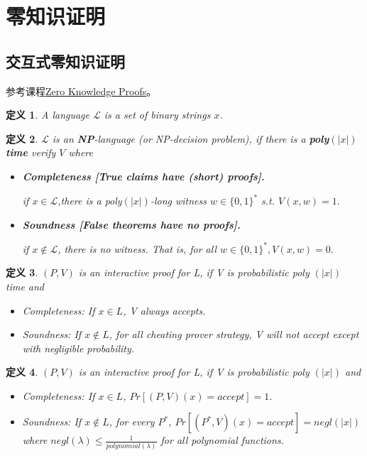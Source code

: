 \documentclass[10pt]{ctexart}
\newtheorem{definition}{定义}
\begin{document}
\section{零知识证明}
\subsection{交互式零知识证明}
参考课程\href{https://zk-learning.org/}{Zero Knowledge Proofs}。
\begin{definition}
	A language $\mathcal{L}$ is a set of binary strings $x$.
\end{definition}
\begin{definition}
	$\mathcal{L}$ is an \textbf{NP}-language (or NP-decision problem), if there is a \textbf{poly$(|x|)$ time} verify $V$ where
	\begin{itemize}
		 \item \textbf{Completeness [True claims have (short) proofs].}
		 
		if $x \in \mathcal{L}$,there is a poly$(|x|)$-long witness $w \in \{0,1\}^*$ s.t. $V(x,w) = 1.$
		\item \textbf{Soundness [False theorems have no proofs].}
		
		if $x \notin \mathcal{L}$, there is no witness. That is, for all $w \in \{0,1\}^*,V(x,w) = 0.$
	\end{itemize}
\end{definition}

\begin{definition}
	$(P, V)$ is an interactive proof for L, if V is probabilistic poly $(|x|)$ time and
	\begin{itemize}
		\item Completeness: If $x \in L$, V always accepts.
		\item Soundness: If $x \notin L$, for all {\color{blue}cheating prover strategy}, V will not accept
		except with negligible probability.
	\end{itemize}
\end{definition}

\begin{definition}
	$(P, V)$ is an interactive proof for L, if V is probabilistic poly $(|x|)$ and
	\begin{itemize}
		\item Completeness: If $x\in L$, $Pr[(P,V)(x)= accept]=1$.
		\item Soundness: If $x \notin L$, for every $P^*$, $Pr[(P^*,V)(x)= accept]=negl(|x|)$
		where $negl(\lambda) \le \frac{1}{polynomial(\lambda)}$ for all polynomial functions.
	\end{itemize}
\end{definition}
\end{document}
